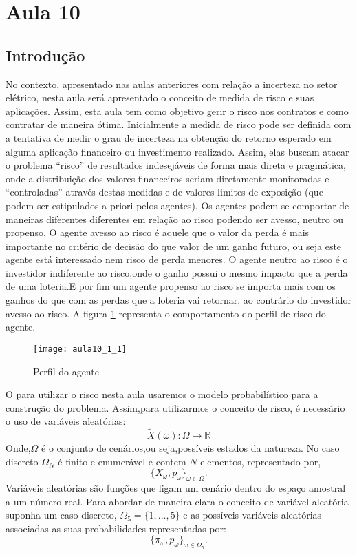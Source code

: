 \section{Aula 10}

\subsection{Introdução}
  No contexto, apresentado nas aulas anteriores com relação a incerteza no setor elétrico, nesta aula será apresentado o conceito de medida de risco e suas aplicações. Assim, esta aula tem como objetivo gerir o risco nos contratos e como contratar de maneira ótima.
  Inicialmente a medida de risco pode ser definida com a tentativa de medir o grau de incerteza na obtenção do retorno esperado em alguma aplicação financeiro ou investimento realizado. Assim, elas buscam atacar o problema “risco” de resultados indesejáveis de forma mais direta e pragmática, onde a distribuição dos valores financeiros seriam diretamente monitoradas e “controladas” através destas medidas e de valores limites de exposição (que podem ser estipulados a priori pelos agentes). 
  Os agentes podem se comportar de maneiras diferentes diferentes em relação ao risco podendo ser avesso, neutro ou propenso. O agente avesso ao risco é aquele que o valor da perda é mais importante no critério de decisão do que valor de um ganho futuro, ou seja este agente está interessado nem risco de perda menores. O agente neutro ao risco é o investidor indiferente ao risco,onde o ganho possui o mesmo impacto que a perda de uma loteria.E por fim um agente propenso ao risco se importa mais com os ganhos do que com as perdas que a loteria vai retornar, ao contrário do investidor avesso ao risco. A figura \ref{fig:aula10_1_1} representa o comportamento do perfil de risco do agente.
 
\begin{figure}[H]
\begin{centering}
\texttt{[image: aula10\_1\_1]}\protect\caption{\label{fig:aula10_1_1} Perfil do agente}
\end{centering}
\end{figure}

O para utilizar o risco nesta aula usaremos o modelo probabilístico para a construção do problema. Assim,para utilizarmos o conceito de risco, é necessário o uso de variáveis aleatórias: \[
\tilde{X}(\omega):\Omega\rightarrow\mathbb{R}
\]
Onde,$\Omega$ é o conjunto de cenários,ou seja,possíveis estados da natureza. No caso discreto $\Omega_{N}$ é finito e enumerável  e contem $N$ elementos, representado por,
\[
\{X_{\omega},p_{\omega}\}_{\omega\in\Omega}.
\]
 Variáveis aleatórias são funções que ligam um cenário dentro do espaço amostral a um número real. Para abordar de maneira clara o conceito de variável aleatória suponha um caso discreto, $\Omega_{5}=\{1,...,5\}$ e as possíveis variáveis aleatórias associadas as suas probabilidades representadas por:
 \[
\{\pi_{\omega},p_{\omega}\}_{\omega\in\Omega_{5}}.
\]

